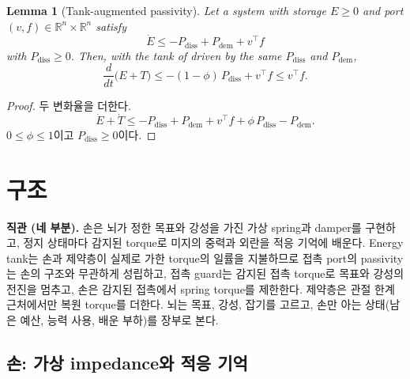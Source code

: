 \documentclass[11pt]{article}\usepackage[margin=1in]{geometry}\usepackage{amsmath,amssymb,amsthm,mathtools}\usepackage{graphicx}\graphicspath{{figures/}{../figures/}{figs/}{./}}\usepackage{enumitem}\usepackage{hyperref}\usepackage{cleveref}\usepackage{tikz}\usetikzlibrary{arrows.meta,positioning,calc,shapes.geometric}\usepackage{float}\usepackage{rotating}\usepackage[most]{tcolorbox}\usepackage{kotex}\usepackage{booktabs}\usepackage{longtable}\emergencystretch=1.6em\tolerance=2000 \crefname{assumption}{Assumption}{Assumptions}\Crefname{assumption}{Assumption}{Assumptions}\crefname{definition}{Definition}{Definitions}\Crefname{definition}{Definition}{Definitions}\crefname{proposition}{Proposition}{Propositions}\Crefname{proposition}{Proposition}{Propositions}\crefname{fact}{Fact}{Facts}\Crefname{fact}{Fact}{Facts} \newtheorem{assumption}{Assumption}\newtheorem{definition}{Definition}\newtheorem{lemma}{Lemma}\newtheorem{proposition}{Proposition}\newtheorem{theorem}{Theorem}\newtheorem{corollary}{Corollary}\newtheorem{fact}{Fact}\theoremstyle{remark}\newtheorem{remark}{Remark} \newcommand{\R}{\mathbb{R}}\newcommand{\xb}{\bar x}\newcommand{\Ab}{\bar A}\newcommand{\By}{\bar B_y}\newcommand{\U}{\mathcal U}\newcommand{\Z}{\mathcal Z}
\begin{document}
\begin{lemma}[Tank-augmented passivity]
\label{lem:tank}
Let a system with storage $E\ge0$ and port $(v,f)\in\R^{n}\times\R^{n}$ satisfy
\[
\dot E\le-P_{\mathrm{diss}}+P_{\mathrm{dem}}+v^\top f
\]
with $P_{\mathrm{diss}}\ge0$. Then, with the tank of  driven by the same $P_{\mathrm{diss}}$ and $P_{\mathrm{dem}}$,
\[
\frac{d}{dt}\big(E+T\big)\le-(1-\phi)\,P_{\mathrm{diss}}+v^\top f\le v^\top f .
\]
\end{lemma}

\begin{proof}
두 변화율을 더한다.
\[
\dot E+\dot T\le-P_{\mathrm{diss}}+P_{\mathrm{dem}}+v^\top f+\phi\,P_{\mathrm{diss}}-P_{\mathrm{dem}} .
\]
$0\le\phi\le1$이고 $P_{\mathrm{diss}}\ge0$이다.
\end{proof}

\section{구조}
\label{sec:arch}

\textbf{직관 (네 부분).} 손은 뇌가 정한 목표와 강성을 가진 가상 spring과 damper를 구현하고, 정지 상태마다 감지된 torque로 미지의 중력과 외란을 적응 기억에 배운다. Energy tank는 손과 제약층이 실제로 가한 torque의 일률을 지불하므로 접촉 port의 passivity는 손의 구조와 무관하게 성립하고, 접촉 guard는 감지된 접촉 torque로 목표와 강성의 전진을 멈추고, 손은 감지된 접촉에서 spring torque를 제한한다. 제약층은 관절 한계 근처에서만 복원 torque를 더한다. 뇌는 목표, 강성, 잡기를 고르고, 손만 아는 상태(남은 예산, 능력 사용, 배운 부하)를 장부로 본다.

\subsection{손: 가상 impedance와 적응 기억}
\end{document}

